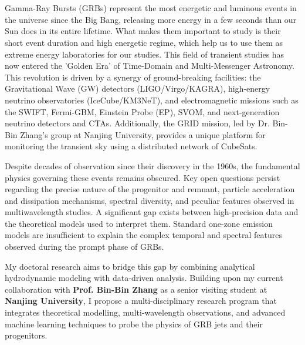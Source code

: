 \section*{\fontsize{12.5 pt}{10 pt}\selectfont{Introduction and Scientific Rationale}}

\hfill

Gamma-Ray Bursts (GRBs) represent the most energetic and luminous events in the universe since the Big Bang, releasing more energy in a few seconds than our Sun does in its entire lifetime. What makes them important to study is their short event duration and high energetic regime, which help us to use them as extreme energy laboratories for our studies. This field of transient studies has now entered the 'Golden Era' of Time-Domain and Multi-Messenger Astronomy. This revolution is driven by a synergy of ground-breaking facilities: the Gravitational Wave (GW) detectors (LIGO/Virgo/KAGRA), high-energy neutrino observatories (IceCube/KM3NeT), and electromagnetic missions such as the SWIFT, Fermi-GBM, Einstein Probe (EP), SVOM, and next-generation neutrino detectors and CTAs. Additionally, the GRID mission, led by Dr. Bin-Bin Zhang’s group at Nanjing University, provides a unique platform for monitoring the transient sky using a distributed network of CubeSats.

\vspace{0.10 cm}

Despite decades of observation since their discovery in the 1960s, the fundamental physics governing these events remains obscured. Key open questions persist regarding the precise nature of the progenitor and remnant, particle acceleration and dissipation mechanisms, spectral diversity, and peculiar features observed in multiwavelength studies. A significant gap exists between high-precision data and the theoretical models used to interpret them. Standard one-zone emission models are insufficient to explain the complex temporal and spectral features observed during the prompt phase of GRBs. 

\vspace{0.10 cm}

My doctoral research aims to bridge this gap by combining analytical hydrodynamic modeling with data-driven analysis. Building upon my current collaboration with \textbf{Prof. Bin-Bin Zhang} as a senior visiting student at \textbf{Nanjing University}, I propose a multi-disciplinary research program that integrates theoretical modelling, multi-wavelength observations, and advanced machine learning techniques to probe the physics of GRB jets and their progenitors. 

